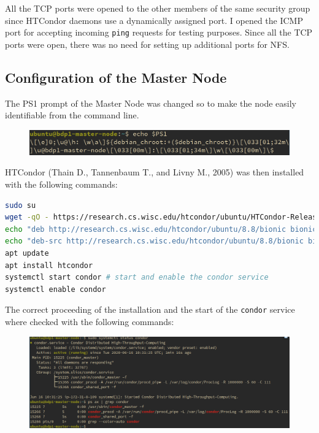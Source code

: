 \documentclass{article}
\begin{document}
All the TCP ports were opened to the other members of the same security group since HTCondor daemons use a dynamically assigned port.
I opened the ICMP port for accepting incoming \texttt{ping} requests for testing purposes.
Since all the TCP ports were open, there was no need for setting up additional ports for NFS\@.

\subsection{Configuration of the Master Node}
The PS1 prompt of the Master Node was changed so to make the node easily identifiable from the command line.

\begin{figure}[!h]
    \center%
    \includegraphics[width=\textwidth]{./images/master-ps1.png}
\end{figure}
\FloatBarrier%

HTCondor (Thain D., Tannenbaum T., and Livny M., 2005) was then installed with the following commands:

\begin{lstlisting}[language=bash]
sudo su
wget -qO - https://research.cs.wisc.edu/htcondor/ubuntu/HTCondor-Release.gpg.key | apt-key add - # import the gpg key of HTCondor
echo "deb http://research.cs.wisc.edu/htcondor/ubuntu/8.8/bionic bionic contrib" >> /etc/apt/sources.list # add the repository
echo "deb-src http://research.cs.wisc.edu/htcondor/ubuntu/8.8/bionic bionic contrib" >> /etc/apt/sources.list
apt update
apt install htcondor
systemctl start condor # start and enable the condor service
systemctl enable condor
\end{lstlisting}

The correct proceeding of the installation and the start of the \texttt{condor} service where checked with the following commands:

\begin{figure}[!h]
    \center%
    \includegraphics[width=\textwidth]{./images/condor_installed.png}
\end{figure}
\end{document}
